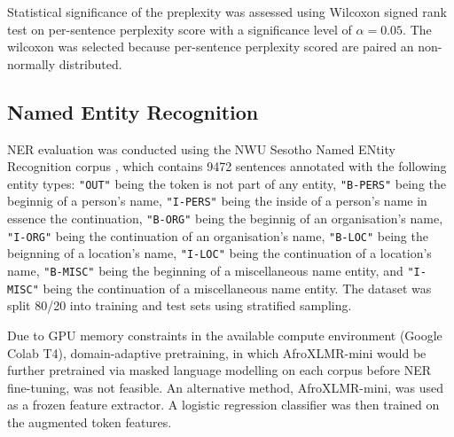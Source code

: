 \documentclass[11pt,a4paper]{article}
\begin{document}
Statistical significance of the preplexity was assessed using Wilcoxon signed rank test on per-sentence perplexity score with a significance level of $\alpha = 0.05$. The wilcoxon was selected because per-sentence perplexity scored are paired an non-normally distributed.


\subsection{Named Entity Recognition}

NER evaluation was conducted using the NWU Sesotho Named ENtity Recognition corpus \citep{eiselen2014developing}, which contains 9472 sentences annotated with the following entity types: \texttt{"OUT"} being the token is not part of any entity, \texttt{"B-PERS"} being the beginnig of a person's name, \texttt{"I-PERS"} being the inside of a person's name in essence the continuation, \texttt{"B-ORG"} being the beginnig of an organisation's name, \texttt{"I-ORG"} being the continuation of an organisation's name, \texttt{"B-LOC"} being the beignning of a location's name, \texttt{"I-LOC"} being the continuation of a location's name, \texttt{"B-MISC"} being the beginning of a miscellaneous name entity, and \texttt{"I-MISC"} being the continuation of a miscellaneous name entity. The dataset was split 80/20 into training and test sets using stratified sampling. 

Due to GPU memory constraints in the available compute environment (Google Colab T4), domain-adaptive pretraining, in which AfroXLMR-mini \citep{alabi-etal-2025-charting} would be further pretrained via masked language modelling on each corpus before NER fine-tuning, was not feasible. An alternative method, AfroXLMR-mini, was used as a frozen feature extractor. A logistic regression classifier was then trained on the augmented token features.




\clearpage

  
\end{document}
